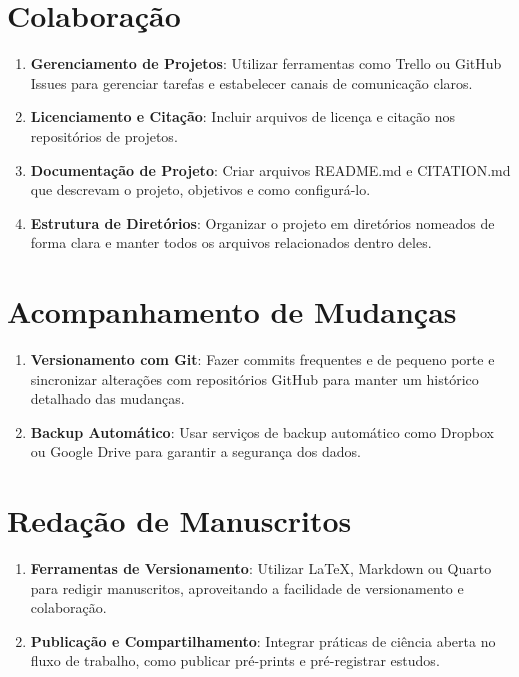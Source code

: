 \documentclass[
  a4paper,
]{book}
\providecommand{\tightlist}{%
  \setlength{\itemsep}{0pt}\setlength{\parskip}{0pt}}\usepackage{longtable,booktabs,array}
\begin{document}
\section{Colaboração}\label{colaborauxe7uxe3o}

\begin{enumerate}
\def\labelenumi{\arabic{enumi}.}
\tightlist
\item
  \textbf{Gerenciamento de Projetos}: Utilizar ferramentas como Trello
  ou GitHub Issues para gerenciar tarefas e estabelecer canais de
  comunicação claros.
\item
  \textbf{Licenciamento e Citação}: Incluir arquivos de licença e
  citação nos repositórios de projetos.
\item
  \textbf{Documentação de Projeto}: Criar arquivos README.md e
  CITATION.md que descrevam o projeto, objetivos e como configurá-lo.
\item
  \textbf{Estrutura de Diretórios}: Organizar o projeto em diretórios
  nomeados de forma clara e manter todos os arquivos relacionados dentro
  deles.
\end{enumerate}

\section{Acompanhamento de
Mudanças}\label{acompanhamento-de-mudanuxe7as}

\begin{enumerate}
\def\labelenumi{\arabic{enumi}.}
\tightlist
\item
  \textbf{Versionamento com Git}: Fazer commits frequentes e de pequeno
  porte e sincronizar alterações com repositórios GitHub para manter um
  histórico detalhado das mudanças.
\item
  \textbf{Backup Automático}: Usar serviços de backup automático como
  Dropbox ou Google Drive para garantir a segurança dos dados.
\end{enumerate}

\section{Redação de Manuscritos}\label{redauxe7uxe3o-de-manuscritos}

\begin{enumerate}
\def\labelenumi{\arabic{enumi}.}
\tightlist
\item
  \textbf{Ferramentas de Versionamento}: Utilizar LaTeX, Markdown ou
  Quarto para redigir manuscritos, aproveitando a facilidade de
  versionamento e colaboração.
\item
  \textbf{Publicação e Compartilhamento}: Integrar práticas de ciência
  aberta no fluxo de trabalho, como publicar pré-prints e pré-registrar
  estudos.
\end{enumerate}
\end{document}

